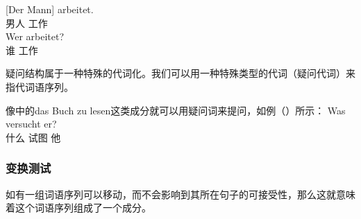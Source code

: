 \eal
\ex 
\gll {}[Der Mann] arbeitet.\\
	 \spacebr{} 男人 工作\\
\ex 
\gll Wer arbeitet?\\
	 谁 工作\\
\zl

\noindent
疑问结构属于一种特殊的代词化。我们可以用一种特殊类型的代词（疑问代词）来指代词语序列。

像中的das Buch zu lesen这类成分就可以用疑问词来提问，如例（）所示：
\ea
\gll Was versucht er?\\
     什么 试图 他\\
\z


\subsubsection{变换测试}
如有一组词语序列可以移动，而不会影响到其所在句子的可接受性，那么这就意味着这个词语序列组成了一个成分。

